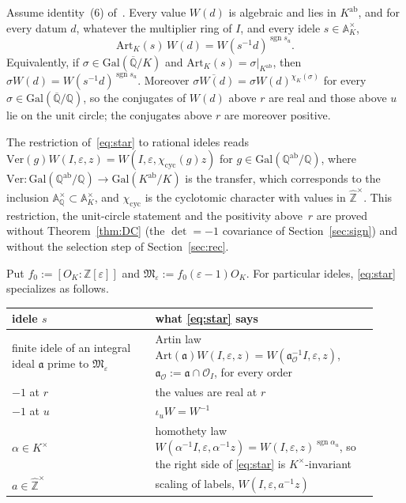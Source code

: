 \documentclass[11pt]{amsart}
\numberwithin{equation}{section}
\theoremstyle{plain}
\newenvironment{lthm}[1]{\renewcommand\thelthminner{#1}\lthminner}{\endlthminner}
\theoremstyle{definition}
\theoremstyle{remark}
\newcommand{\A}{\mathbb{A}}
\newcommand{\Kab}{K^{\mathrm{ab}}}
\newcommand{\Art}{\mathrm{Art}}
\newcommand{\Gal}{\mathrm{Gal}}
\newcommand{\sgn}{\operatorname{sgn}}
\begin{document}
\begin{lthm}{A}[Reciprocity law]\label{thm:A}
Assume identity~(6) of~\cite{RW}. Every value $W(d)$ is algebraic and lies in $\Kab$, and for every datum $d$, whatever the multiplier ring of $I$, and every idele $s\in\A_K^\times$,
\begin{equation}\tag{$\star$}\label{eq:star}
\Art_K(s)\,W(d)=W(s^{-1}d)^{\sgn s_u}.
\end{equation}
Equivalently, if $\sigma\in\Gal(\overline{\mathbb Q}/K)$ and $\Art_K(s)=\sigma|_{\Kab}$, then $\sigma W(d)=W(s^{-1}d)^{\sgn s_u}$. Moreover $\overline{\sigma W(d)}=\sigma W(d)^{\chi_K(\sigma)}$ for every $\sigma\in\Gal(\overline{\mathbb Q}/\mathbb Q)$, so the conjugates of $W(d)$ above $r$ are real and those above $u$ lie on the unit circle; the conjugates above $r$ are moreover positive.
\end{lthm}

The restriction of~\eqref{eq:star} to rational ideles reads $\mathrm{Ver}(g)W(I,\varepsilon,z)=W(I,\varepsilon,\chi_{\mathrm{cyc}}(g)z)$ for $g\in\Gal(\mathbb Q^{\mathrm{ab}}/\mathbb Q)$, where $\mathrm{Ver}\colon\Gal(\mathbb Q^{\mathrm{ab}}/\mathbb Q)\to\Gal(\Kab/K)$ is the transfer, which corresponds to the inclusion $\A_{\mathbb Q}^\times\subset\A_K^\times$, and $\chi_{\mathrm{cyc}}$ is the cyclotomic character with values in $\widehat{\mathbb Z}^\times$. This restriction, the unit-circle statement and the positivity above~$r$ are proved without Theorem~\ref{thm:DC} (the $\det=-1$ covariance of Section~\ref{sec:sign}) and without the selection step of Section~\ref{sec:rec}.

Put $f_0:=[O_K:\mathbb Z[\varepsilon]]$ and $\mathfrak M_\varepsilon:=f_0(\varepsilon-1)O_K$. For particular ideles, \eqref{eq:star} specializes as follows.
\begin{center}
\renewcommand{\arraystretch}{1.25}
\begin{tabular}{>{\raggedright\arraybackslash}p{0.36\linewidth}>{\raggedright\arraybackslash}p{0.56\linewidth}}
\hline
idele $s$ & what \eqref{eq:star} says\\
\hline
finite idele of an integral ideal $\mathfrak a$ prime to $\mathfrak M_\varepsilon$ & Artin law $\Art(\mathfrak a)W(I,\varepsilon,z)=W(\mathfrak a_{\mathcal O}^{-1}I,\varepsilon,z)$, $\mathfrak a_{\mathcal O}:=\mathfrak a\cap\mathcal O_I$, for every order\\
$-1$ at $r$ & the values are real at $r$\\
$-1$ at $u$ & $\iota_uW=W^{-1}$\\
$\alpha\in K^\times$ & homothety law $W(\alpha^{-1}I,\varepsilon,\alpha^{-1}z)=W(I,\varepsilon,z)^{\sgn\alpha_u}$, so the right side of \eqref{eq:star} is $K^\times$-invariant\\
$a\in\widehat{\mathbb Z}^\times$ & scaling of labels, $W(I,\varepsilon,a^{-1}z)$\\
\hline
\end{tabular}
\end{center}
\end{document}
